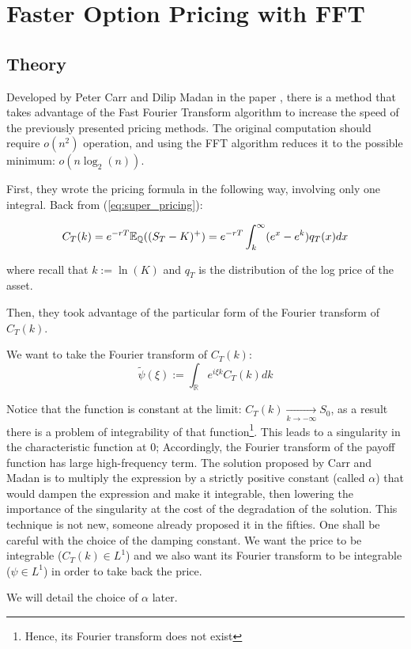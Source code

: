 \section{Faster Option Pricing with FFT}
\subsection{Theory}

Developed by Peter Carr and Dilip Madan in the paper \cite{CarrMadan}, there is a method that takes advantage of the Fast Fourier Transform algorithm to increase the speed of the previously presented pricing methods. The original computation should require $o(n^2)$ operation, and using the FFT algorithm reduces it to the possible minimum: $o(n \log_2(n)) $.

First, they wrote the pricing formula in the following way, involving only one integral. Back from (\ref{eq:super_pricing}):

$$ C_T(k) = e^{-rT } \mathbb E_{\mathbb Q} ( (S_T - K)^+ ) = e^{-rT } \int_k^{\infty} (e^x - e^k) q_T (x) dx $$

where recall that $k := \ln (K)$ and $q_T$ is the distribution of the log price of the asset.

Then, they took advantage of the particular form of the Fourier transform of $C_T(k)$.

We want to take the Fourier transform of $C_T(k)$:$$\tilde{\psi}(\xi) := \int_{\mathbb  R} e^{i \xi k } C_T(k) dk  $$

Notice that the function is constant at the limit: 
$C_T(k) \xrightarrow[k \to -\infty]{} S_0$, as a result there is a problem of integrability of that function\footnote{Hence, its Fourier transform does not exist}. This leads to a singularity in the characteristic function at $0$; Accordingly, the Fourier transform of the payoff function has large high-frequency term.  The solution proposed by Carr and Madan is to multiply the expression by a strictly positive constant (called $\alpha$) that would dampen the expression and make it integrable, then lowering the importance of the singularity at the cost of the degradation of the solution. This technique is not new, someone already proposed it in the fifties. One shall be careful with the choice of the damping constant. We want the price to be integrable ($ C_T(k) \in L^1$) and we also want its Fourier transform to be integrable ($\psi \in L^1$) in order to take back the price. 

We will detail the choice of $\alpha$ later.

